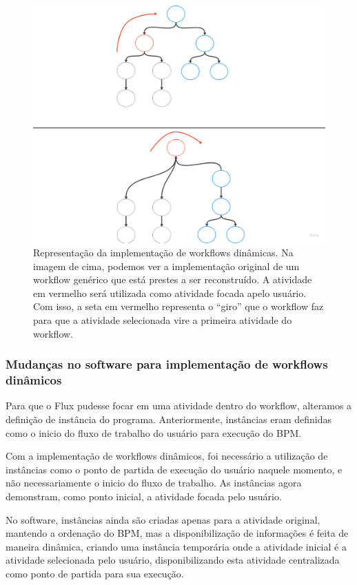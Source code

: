\begin{figure}
    \centering
    \includegraphics[width=1\textwidth]{imgs/Implementacoes/primeiraImplementacao.png}
    \caption{Representação da implementação de workflows dinâmicas. Na imagem de cima, podemos ver a implementação original de um workflow genérico que está prestes a ser reconstruído. A atividade em vermelho será utilizada como atividade focada apelo usuário. Com isso, a seta em vermelho representa o ``giro'' que o workflow faz para que a atividade selecionada vire a primeira atividade do workflow.}
    \label{fig:primeira_implementacao}
\end{figure}

\subsubsection{Mudanças no software para implementação de workflows dinâmicos}

Para que o Flux pudesse focar em uma atividade dentro do workflow, alteramos a definição de instância do programa. Anteriormente, instâncias eram definidas como o inicio do fluxo de trabalho do usuário para execução do BPM.

Com a implementação de workflows dinâmicos, foi necessário a utilização de instâncias como o ponto de partida de execução do usuário naquele momento, e não necessariamente o inicio do fluxo de trabalho. As instâncias agora demonstram, como ponto inicial, a atividade focada pelo usuário.

No software, instâncias ainda são criadas apenas para a atividade original, mantendo a ordenação do BPM, mas a disponibilização de informações é feita de maneira dinâmica, criando uma instância temporária onde a atividade inicial é a atividade selecionada pelo usuário, disponibilizando esta atividade centralizada como ponto de partida para sua execução.

